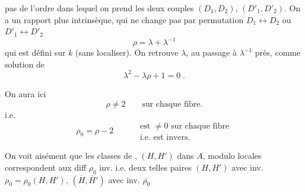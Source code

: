 pas de l'ordre dans lequel on prend les deux  couples $(D_1,D_2)$, $(D'_1,D'_2)$. On a un rapport plus intrinsèque, qui ne change pas par permutation $D_1\leftrightarrow D_2$ ou $D'_1\leftrightarrow D'_2$
\[
\rho=\lambda+\lambda^{-1}
\]
qui est défini sur $k$ (sans localiser). On retrouve $\lambda$, au passage à $\lambda^{-1}$ près, comme solution de
\[
\lambda^2-\lambda\rho+1=0\;.
\]

 On aura ici
\[
\rho\ne 2\qquad\text{sur chaque fibre.}
\]
i.e.
\[
\rho_0=\rho-2\qquad\begin{aligned}&\text{est $\ne0$ sur chaque fibre}\\[-2pt]&\text{i.e. est invers.}\end{aligned}
\]

On voit  aisément que les classes de ,  $(H,H')$ dans $A$,  modulo  locales correspondent aux diff $\rho_0$ inv. i.e.  deux telles paires $(H,H')$ avec inv. $\rho_0=\rho_0(H,H')$, $(\overline H,\overline H')$ avec inv. $\overline{\rho_0}$
